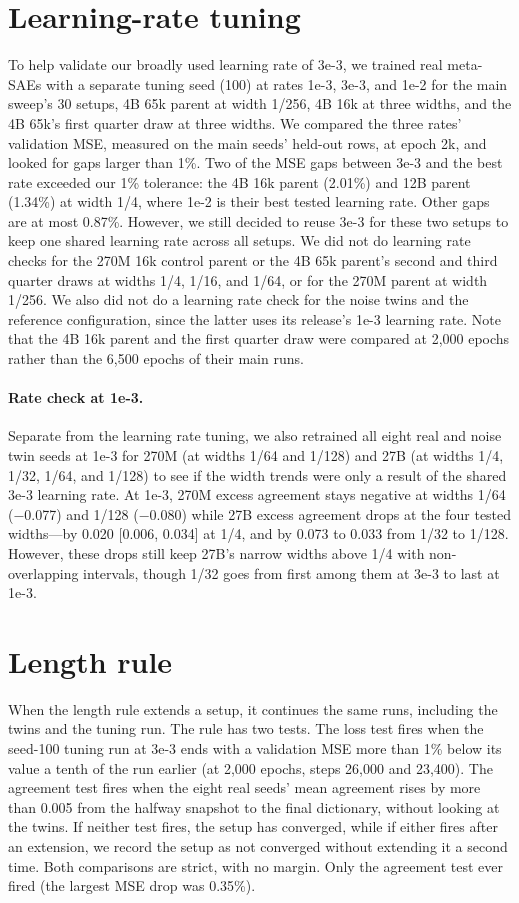 \section{Learning-rate tuning}
To help validate our broadly used learning rate of 3e-3, we trained real meta-SAEs with a separate tuning seed (100) at rates 1e-3, 3e-3, and 1e-2 for the main sweep's 30 setups, 4B 65k parent at width 1/256, 4B 16k at three widths, and the 4B 65k's first quarter draw at three widths.
We compared the three rates' validation MSE, measured on the main seeds' held-out rows, at epoch 2k, and looked for gaps larger than 1\%.
Two of the MSE gaps between 3e-3 and the best rate exceeded our 1\% tolerance: the 4B 16k parent (2.01\%) and 12B parent (1.34\%) at width 1/4, where 1e-2 is their best tested learning rate.
Other gaps are at most 0.87\%.
However, we still decided to reuse 3e-3 for these two setups to keep one shared learning rate across all setups.
We did not do learning rate checks for the 270M 16k control parent or the 4B 65k parent's second and third quarter draws at widths 1/4, 1/16, and 1/64, or for the 270M parent at width 1/256.
We also did not do a learning rate check for the noise twins and the reference configuration, since the latter uses its release's 1e-3 learning rate.
Note that the 4B 16k parent and the first quarter draw were compared at 2,000 epochs rather than the 6,500 epochs of their main runs.

\paragraph{Rate check at 1e-3.}
Separate from the learning rate tuning, we also retrained all eight real and noise twin seeds at 1e-3 for 270M (at widths 1/64 and 1/128) and 27B (at widths 1/4, 1/32, 1/64, and 1/128) to see if the width trends were only a result of the shared 3e-3 learning rate.
At \mbox{1e-3}, 270M excess agreement stays negative at widths 1/64 ($-$0.077) and 1/128 ($-$0.080) while 27B excess agreement drops at the four tested widths---by 0.020 [0.006, 0.034] at 1/4, and by 0.073 to 0.033 from 1/32 to 1/128.
However, these drops still keep 27B's narrow widths above 1/4 with non-overlapping intervals, though 1/32 goes from first among them at 3e-3 to last at 1e-3.

\section{Length rule}
When the length rule extends a setup, it continues the same runs, including the twins and the tuning run.
The rule has two tests.
The loss test fires when the seed-100 tuning run at 3e-3 ends with a validation MSE more than 1\% below its value a tenth of the run earlier (at 2,000 epochs, steps 26,000 and 23,400).
The agreement test fires when the eight real seeds' mean agreement rises by more than 0.005 from the halfway snapshot to the final dictionary, without looking at the twins.
If neither test fires, the setup has converged, while if either fires after an extension, we record the setup as not converged without extending it a second time.
Both comparisons are strict, with no margin.
Only the agreement test ever fired (the largest MSE drop was 0.35\%).

